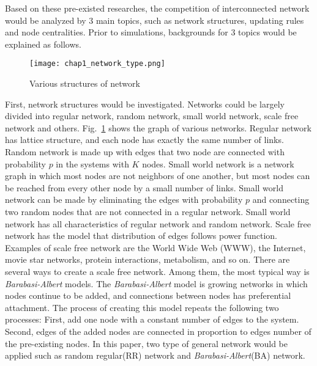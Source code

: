Based on these pre-existed researches, the competition of interconnected network would be analyzed by 3 main topics, such as network structures, updating rules and node centralities. Prior to simulations, backgrounds for 3 topics would be explained as follows. 
\begin{figure}[!htb]
	\centering
	\texttt{[image: chap1\_network\_type.png]}
	\caption{Various structures of network}
	\label{chap1_network_type}
\end{figure}
First, network structures would be investigated. Networks could be largely divided into regular network, random network\parencite{erdos1960}, small world network\parencite{watts1998}, scale free network\parencite{barabasi1999} and others. Fig.~\ref{chap1_network_type} shows the graph of various networks. 
Regular network has lattice structure, and  each node has exactly the same number of links. Random network is made up with edges that two node are connected with probability $p$ in the systems with $K$ nodes. 
Small world network is a network graph in which most nodes are not neighbors of one another, but most nodes can be reached from every other node by a small number of links. Small world network can be made by eliminating the edges with probability $p$ and connecting two random nodes that are not connected in a regular network. Small world network has all characteristics of regular network and random network.
Scale free network has the model that distribution of edges follows power function. Examples of scale free network are the World Wide Web (WWW), the Internet, movie star networks, protein interactions, metabolism, and so on.
There are several ways to create a scale free network. Among them, the most typical way is \textit{Barabasi-Albert} models.
The \textit{Barabasi-Albert} model is growing networks in which nodes continue to be added, and connections between nodes has preferential attachment. The process of creating this model repeats the following two processes: First, add one node with a constant number of edges to the system. Second, edges of the added nodes are connected in proportion to edges number of the pre-existing nodes.
In this paper, two type of general network would be applied such as random regular(RR) network and \textit{Barabasi-Albert}(BA) network. 

